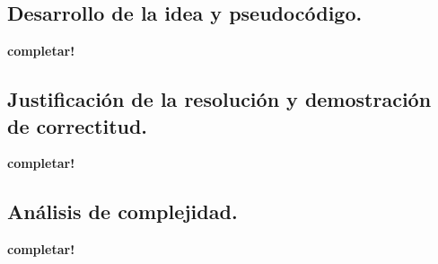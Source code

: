


\newpage
\subsection{Desarrollo de la idea y pseudocódigo.}

\vspace*{0.3cm}

\textbf{completar!}

\newpage
\subsection{Justificación de la resolución y demostración de correctitud.}

\vspace*{0.3cm}

\textbf{completar!}



\newpage
\subsection{Análisis de complejidad.}

\vspace*{0.3cm}

\textbf{completar!}


